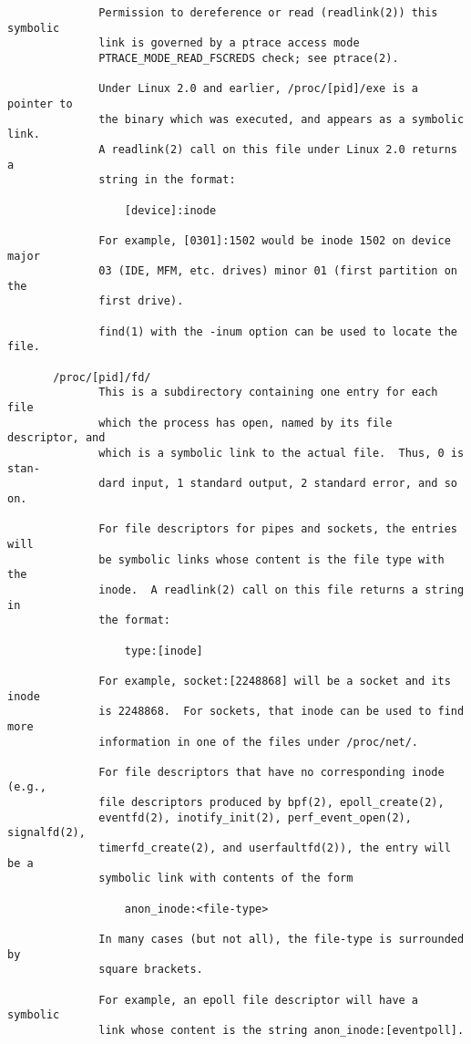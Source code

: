 \documentclass[]{article}
\begin{document}
\begin{verbatim}
              Permission to dereference or read (readlink(2)) this symbolic
              link is governed by a ptrace access mode
              PTRACE_MODE_READ_FSCREDS check; see ptrace(2).

              Under Linux 2.0 and earlier, /proc/[pid]/exe is a pointer to
              the binary which was executed, and appears as a symbolic link.
              A readlink(2) call on this file under Linux 2.0 returns a
              string in the format:

                  [device]:inode

              For example, [0301]:1502 would be inode 1502 on device major
              03 (IDE, MFM, etc. drives) minor 01 (first partition on the
              first drive).

              find(1) with the -inum option can be used to locate the file.

       /proc/[pid]/fd/
              This is a subdirectory containing one entry for each file
              which the process has open, named by its file descriptor, and
              which is a symbolic link to the actual file.  Thus, 0 is stan‐
              dard input, 1 standard output, 2 standard error, and so on.

              For file descriptors for pipes and sockets, the entries will
              be symbolic links whose content is the file type with the
              inode.  A readlink(2) call on this file returns a string in
              the format:

                  type:[inode]

              For example, socket:[2248868] will be a socket and its inode
              is 2248868.  For sockets, that inode can be used to find more
              information in one of the files under /proc/net/.

              For file descriptors that have no corresponding inode (e.g.,
              file descriptors produced by bpf(2), epoll_create(2),
              eventfd(2), inotify_init(2), perf_event_open(2), signalfd(2),
              timerfd_create(2), and userfaultfd(2)), the entry will be a
              symbolic link with contents of the form

                  anon_inode:<file-type>

              In many cases (but not all), the file-type is surrounded by
              square brackets.

              For example, an epoll file descriptor will have a symbolic
              link whose content is the string anon_inode:[eventpoll].


\end{verbatim}
\end{document}
